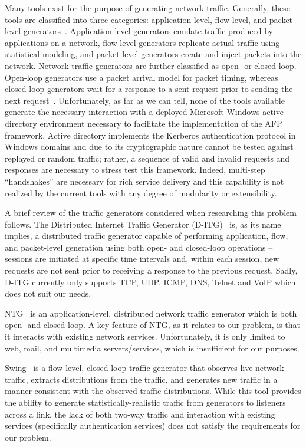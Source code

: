 \noindent Many tools exist for the purpose of generating network traffic.
Generally, these tools are classified into three categories: application-level,
flow-level, and packet-level generators~\cite{botta2012,zach2013}.
Application-level generators emulate traffic produced by applications on a
network, flow-level generators replicate actual traffic using statistical
modeling, and packet-level generators create and inject packets into the
network.  Network traffic generators are further classified as open- or
closed-loop.  Open-loop generators use a packet arrival model for packet
timing, whereas closed-loop generators wait for a response to a sent request
prior to sending the next request~\cite{weigle2006}.  Unfortunately, as far as
we can tell, none of the tools available generate the necessary interaction
with a deployed Microsoft Windows active directory environment necessary to
facilitate the implementation of the AFP framework.  Active directory
implements the Kerberos authentication protocol in Windows domains and due to
its cryptographic nature cannot be tested against replayed or random traffic;
rather, a sequence of valid and invalid requests and responses are necessary to
stress test this framework.  Indeed, multi-step ``handshakes'' are necessary
for rich service delivery and this capability is not realized by the current
tools with any degree of modularity or extensibility.

A brief review of the traffic generators considered when researching this
problem follows.  The Distributed Internet Traffic Generator
(D-ITG)~\cite{botta2012} is, as its name implies, a distributed traffic
generator capable of performing application, flow, and packet-level generation
using both open- and closed-loop operations -- sessions are initiated at
specific time intervals and, within each session, new requests are not sent
prior to receiving a response to the previous request.  Sadly, D-ITG currently
only supports TCP, UDP, ICMP, DNS, Telnet and VoIP which does not suit our
needs.

NTG~\cite{zach2013} is an application-level, distributed network traffic
generator which is both open- and closed-loop.  A key feature of NTG, as it
relates to our problem, is that it interacts with existing network services.
Unfortunately, it is only limited to web, mail, and multimedia
servers/services, which is insufficient for our purposes.

Swing~\cite{vishwanath2009} is a flow-level, closed-loop traffic generator that
observes live network traffic, extracts distributions from the traffic, and
generates new traffic in a manner consistent with the observed traffic
distributions.  While this tool provides the ability to generate
statistically-realistic traffic from generators to listeners across a link, the
lack of both two-way traffic and interaction with existing services
(specifically authentication services) does not satisfy the requirements for
our problem.

